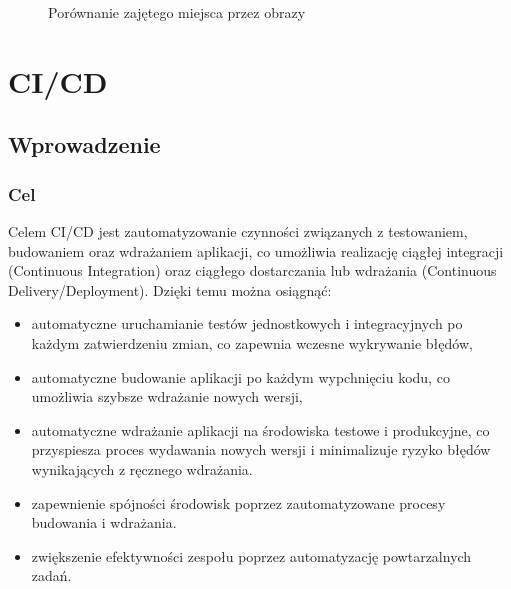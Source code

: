 \documentclass{article}
\begin{document}
\begin{figure}[H]
\centering
{}
\caption{Porównanie zajętego miejsca przez obrazy}
\label{fig:miejsce}
\end{figure}

\section{CI/CD} \label{sectionCICD}

\subsection{Wprowadzenie}

\subsubsection{Cel}

Celem CI/CD jest zautomatyzowanie czynności związanych z testowaniem, budowaniem oraz wdrażaniem aplikacji, co umożliwia realizację ciągłej integracji (Continuous Integration) oraz ciągłego dostarczania lub wdrażania (Continuous Delivery/Deployment). Dzięki temu można osiągnąć:

\begin{itemize}
    \item automatyczne uruchamianie testów jednostkowych i integracyjnych po każdym zatwierdzeniu zmian, co zapewnia wczesne wykrywanie błędów,
    \item automatyczne budowanie aplikacji po każdym wypchnięciu kodu, co umożliwia szybsze wdrażanie nowych wersji,
    \item automatyczne wdrażanie aplikacji na środowiska testowe i produkcyjne, co przyspiesza proces wydawania nowych wersji i minimalizuje ryzyko błędów wynikających z ręcznego wdrażania.
    \item zapewnienie spójności środowisk poprzez zautomatyzowane procesy budowania i wdrażania.
    \item zwiększenie efektywności zespołu poprzez automatyzację powtarzalnych zadań.
\end{itemize}
\end{document}
